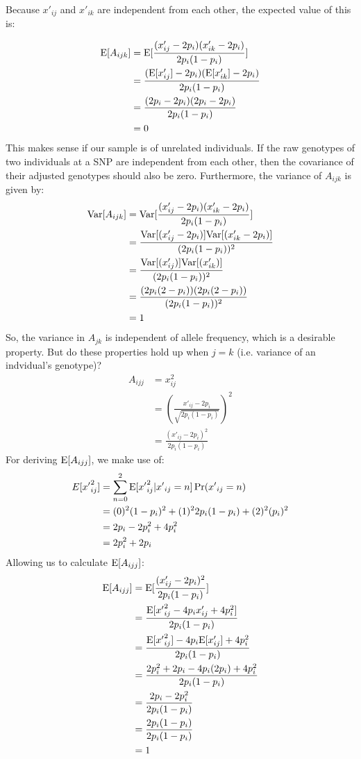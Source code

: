 \documentclass[12pt]{article}
\begin{document}
Because $x'_{ij}$ and $x'_{ik}$ are independent from each other, the expected value of this is:

\begin{align*}
    \mathrm{E}[A_{ijk}] &= \mathrm{E}[\frac{(x'_{ij} - 2 p_i)(x'_{ik} - 2 p_i)}{2 p_i (1 - p_i)}] \\
    &= \frac{(\mathrm{E}[x'_{ij}] - 2 p_i)(\mathrm{E}[x'_{ik}] - 2 p_i)}{2 p_i (1 - p_i)} \\
    &= \frac{(2 p_i - 2 p_i)(2 p_i - 2 p_i)}{2 p_i (1 - p_i)} \\
    &= 0
\end{align*}
This makes sense if our sample is of unrelated individuals.
If the raw genotypes of two individuals at a SNP are independent from each other, then the covariance of their adjusted genotypes should also be zero.
Furthermore, the variance of $A_{ijk}$ is given by:
\begin{align*}
    \mathrm{Var}[A_{ijk}] &= \mathrm{Var}[\frac{(x'_{ij} - 2 p_i)(x'_{ik} - 2 p_i)}{2 p_i (1 - p_i)}] \\
    &= \frac{\mathrm{Var}[(x'_{ij} - 2 p_i)]\mathrm{Var}[(x'_{ik} - 2 p_i)]}{(2 p_i (1 - p_i))^2} \\
    &= \frac{\mathrm{Var}[(x'_{ij})]\mathrm{Var}[(x'_{ik})]}{(2 p_i (1 - p_i))^2} \\
    &= \frac{(2 p_i (2 - p_i))(2 p_i (2 - p_i))}{(2 p_i (1 - p_i))^2} \\
    &= 1
\end{align*}
So, the variance in $A_{jk}$ is independent of allele frequency, which is a desirable property.
But do these properties hold up when $j = k$ (i.e. variance of an indvidual's genotype)?
\begin{align*}
    A_{ijj} &= x_{ij}^2 \\
    &= (\frac{x'_{ij} - 2 p_i}{\sqrt{2 p_i (1 - p_i)}})^2 \\
    &= \frac{(x'_{ij} - 2 p_i)^2}{2 p_i (1 - p_i)}
\end{align*}
For deriving $\mathrm{E}[A_{ijj}]$, we make use of:
\begin{align*}
    E[{x'}_{ij}^2] &= \sum_{n=0}^{2} \mathrm{E}[{x'}_{ij}^2 | {x'}_{ij}=n] \Pr({x'}_{ij}=n) \\
    &= (0)^2 (1-p_i)^2 + (1)^2 2 p_i (1-p_i) + (2)^2 (p_i)^2 \\
    &= 2 p_i - 2 p_i^2 + 4 p_i^2 \\
    &= 2 p_i^2 + 2 p_i
\end{align*}
Allowing us to calculate $\mathrm{E}[A_{ijj}]$:
\begin{align*}
    \mathrm{E}[A_{ijj}] &= \mathrm{E}[\frac{(x'_{ij} - 2 p_i)^2}{2 p_i (1 - p_i)}] \\
    &= \frac{\mathrm{E}[{x'}_{ij}^2 - 4 p_i x'_{ij} + 4 p_i^2]}{2 p_i (1 - p_i)} \\
    &= \frac{\mathrm{E}[{x'}_{ij}^2] - 4 p_i \mathrm{E}[x'_{ij}] + 4 p_i^2}{2 p_i (1 - p_i)} \\
    &= \frac{2 p_i^2 + 2 p_i - 4 p_i (2 p_i) + 4 p_i^2}{2 p_i (1 - p_i)} \\
    &= \frac{2 p_i - 2 p_i^2}{2 p_i (1 - p_i)} \\
    &= \frac{2 p_i (1 - p_i)}{2 p_i (1 - p_i)} \\
    &= 1
\end{align*}
\end{document}
